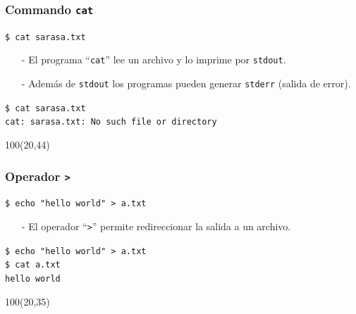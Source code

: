 \documentclass{beamer}
\begin{document}
\begin{frame}[fragile,t]
    \frametitle{Commando \texttt{cat}}
    \begin{block}{\vspace*{-3ex}}
    \texttt{\$}\verb: cat sarasa.txt:
    \vspace*{0.5ex}
    \end{block}
    \begin{itemize}
    \item[-] El programa ``\verb|cat|'' lee un archivo y lo imprime por \verb|stdout|.
    \item[-] Además de \verb|stdout| los programas pueden generar \verb|stderr| (salida de error).
    \end{itemize}
    \vspace{2.5cm}
    \pause
    \begin{block}{\vspace*{-3ex}}
    \texttt{\$}\verb: cat sarasa.txt:\\
    \verb;cat: sarasa.txt: No such file or directory;
    \vspace*{0.5ex}
    \end{block}
    \begin{textblock}{100}(20,44)
    \begin{center}
    \end{center}
    \end{textblock}
\end{frame}

\begin{frame}[fragile,t]
    \frametitle{Operador \texttt{>}}
    \begin{block}{\vspace*{-3ex}}
    \texttt{\$}\verb: echo "hello world" > a.txt:
    \vspace*{0.5ex}
    \end{block}
    \begin{itemize}
    \item[-] El operador ``\verb|>|'' permite redireccionar la salida a un archivo.
    \end{itemize}
    \vspace{2.5cm}
    \pause
    \begin{block}{\vspace*{-3ex}}
    \texttt{\$}\verb: echo "hello world" > a.txt:\\
    \vspace{0.2cm}
    \texttt{\$}\verb: cat a.txt:\\
    \verb:hello world:
    \vspace*{0.5ex}
    \end{block}
    \begin{textblock}{100}(20,35)
    \begin{center}
    \end{center}
    \end{textblock}
\end{frame}
\end{document}
